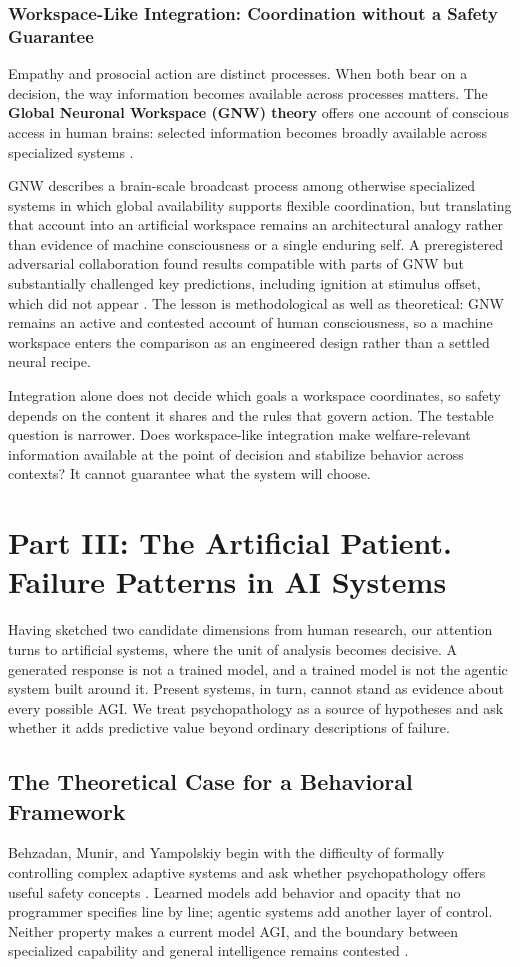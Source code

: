 \documentclass{article}
\begin{document}
\subsubsection{Workspace-Like Integration: Coordination without a Safety Guarantee}
Empathy and prosocial action are distinct processes. When both bear on a decision, the way information becomes available across processes matters. The \textbf{Global Neuronal Workspace (GNW) theory} offers one account of conscious access in human brains: selected information becomes broadly available across specialized systems \citep{ref12}.

GNW describes a brain-scale broadcast process among otherwise specialized systems in which global availability supports flexible coordination, but translating that account into an artificial workspace remains an architectural analogy rather than evidence of machine consciousness or a single enduring self. A preregistered adversarial collaboration found results compatible with parts of GNW but substantially challenged key predictions, including ignition at stimulus offset, which did not appear \citep{ref69}. The lesson is methodological as well as theoretical: GNW remains an active and contested account of human consciousness, so a machine workspace enters the comparison as an engineered design rather than a settled neural recipe.

Integration alone does not decide which goals a workspace coordinates, so safety depends on the content it shares and the rules that govern action. The testable question is narrower. Does workspace-like integration make welfare-relevant information available at the point of decision and stabilize behavior across contexts? It cannot guarantee what the system will choose.

\section{Part III: The Artificial Patient. Failure Patterns in AI Systems}
Having sketched two candidate dimensions from human research, our attention turns to artificial systems, where the unit of analysis becomes decisive. A generated response is not a trained model, and a trained model is not the agentic system built around it. Present systems, in turn, cannot stand as evidence about every possible AGI. We treat psychopathology as a source of hypotheses and ask whether it adds predictive value beyond ordinary descriptions of failure.
\subsection{The Theoretical Case for a Behavioral Framework}
Behzadan, Munir, and Yampolskiy begin with the difficulty of formally controlling complex adaptive systems and ask whether psychopathology offers useful safety concepts \citep{ref3}. Learned models add behavior and opacity that no programmer specifies line by line; agentic systems add another layer of control. Neither property makes a current model AGI, and the boundary between specialized capability and general intelligence remains contested \citep{ref13, ref18}.
\end{document}
